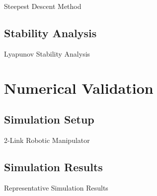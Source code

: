 \documentclass[8pt, aspectratio=169]{beamer}
\begin{document}
\begin{frame}{\insertsubsectionhead}{Steepest Descent Method}


\end{frame}
\subsection{Stability Analysis}

\begin{frame}{\insertsubsectionhead}{Lyapunov Stability Analysis}


\end{frame}

\section{Numerical Validation}

\subsection{Simulation Setup}
\begin{frame}{\insertsubsectionhead}{2-Link Robotic Manipulator}
    
\end{frame}

\subsection{Simulation Results}

\begin{frame}{Representative Simulation Results}




\end{frame}
\end{document}
